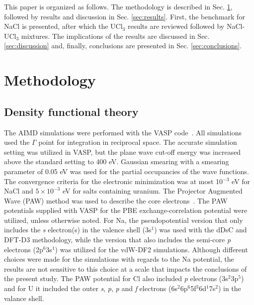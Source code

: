 \documentclass[preprint,3p,10pt,onecolumn,number,sort&compress]{elsarticle}
\begin{document}
This paper is organized as follows. The methodology is described in Sec. \ref{sec:method}, followed by results and discussion in Sec. \ref{sec:results}. First, the benchmark for NaCl is presented, after which the UCl$_3$ results are reviewed followed by NaCl-UCl$_3$ mixtures. The implications of the results are discussed in Sec. \ref{sec:discussion} and, finally, conclusions are presented in Sec. \ref{sec:conclusions}. 

\section{Methodology}
\label{sec:method}
{\color{red}\subsection{Density functional theory}}
The AIMD simulations were performed with the VASP code~\cite{Kresse1996}. All simulations used the $\Gamma$ point for integration in reciprocal space. The accurate simulation setting was utilized in VASP, but the plane wave cut-off energy was increased above the standard setting to 400 eV. Gaussian smearing with a smearing parameter of 0.05 eV was used for the partial occupancies of the wave functions. The convergence criteria for the electronic minimization was at most 10$^{-3}$ eV for NaCl and $5\times10^{-3}$ eV for salts containing uranium. The Projector Augmented Wave (PAW) method was used to describe the core electrons~\cite{PAW1,PAW2}. The PAW potentials supplied with VASP for the PBE exchange-correlation potential were utilized, unless otherwise noted. For Na, the pseudopotential version that only includes the \textit{s} electron(s) in the valence shell {\color{red}(3s$^{1}$)} was used with the dDsC and DFT-D3 methodology, while the version that also includes the semi-core \textit{p} electrons {\color{red}(2p$^6$3s$^{1}$)} was utilized for the vdW-DF2 simulations. Although different choices were made for the simulations with regards to the Na potential, the results are not sensitive to this choice at a scale that impacts the conclusions of the present study. The PAW potential for Cl also included \textit{p} electrons {\color{red}(3s$^2$3p$^5$)} and for U it included the outer \textit{s}, \textit{p}, {\color{red}\textit{p}} and \textit{f} electrons {\color{red}(6s$^2$6p$^6$5f$^3$6d$^1$7s$^2$)} in the valance shell. 
\end{document}
